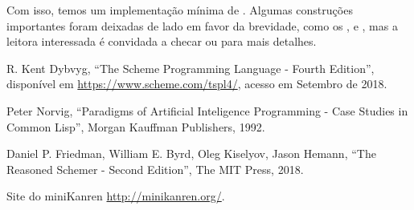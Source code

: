   Com isso, temos um implementação mínima de
  . Algumas construções importantes foram
  deixadas de lado em favor da brevidade, como os
  ,  e ,
  mas a leitora interessada é convidada a checar \cite{will} ou
  \cite{kanren} para mais detalhes.
  
  

    
  \begin{thebibliography}{1}

   R. Kent Dybvyg,
    ``The Scheme Programming Language - Fourth Edition'',
    disponível em \url{https://www.scheme.com/tspl4/}, acesso em
    Setembro de 2018.

   Peter Norvig,
    ``Paradigms of Artificial Inteligence Programming - Case Studies
    in Common Lisp'',
    Morgan Kauffman Publishers, 1992.

     Daniel P. Friedman, William E. Byrd, Oleg Kiselyov,
      Jason Hemann,
      ``The Reasoned Schemer - Second Edition'',
      The MIT Press, 2018.

       Site do miniKanren \url{http://minikanren.org/}.
      
  \end{thebibliography}

%
